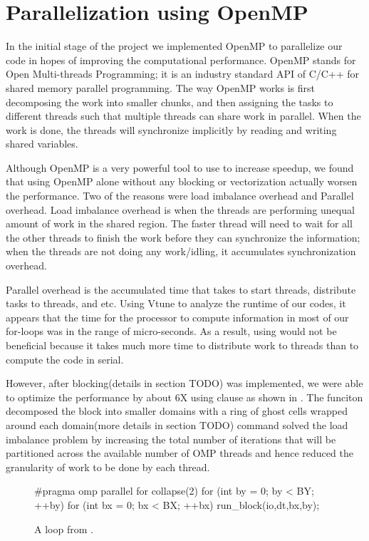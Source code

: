 \section{Parallelization using OpenMP}\label{sec:parallelization}

In the initial stage of the project we implemented OpenMP to parallelize our code in hopes of improving the computational performance. OpenMP stands for Open Multi-threads Programming; it is an industry standard API of C/C++ for shared memory parallel programming.  The way OpenMP works is first decomposing the work into smaller chunks, and then assigning the tasks to different threads such that multiple threads can share work in parallel. When the work is done, the threads will synchronize implicitly by reading and writing shared variables.

Although OpenMP is a very powerful tool to use to increase speedup, we found that using OpenMP alone without any blocking or vectorization actually worsen the performance. Two of the reasons were load imbalance overhead and Parallel overhead. Load imbalance overhead is when the threads are performing unequal amount of work in the shared region. The faster thread will need to wait for all the other threads to finish the work before they can synchronize the information; when the threads are not doing any work/idling, it accumulates synchronization overhead.

Parallel overhead is the accumulated time that takes to start threads, distribute tasks to threads, and etc. Using Vtune to analyze the runtime of our codes, it appears that the time for the processor to compute information in most of our for-loops was in the range of micro-seconds. As a result, using  would not be beneficial because it takes much more time to distribute work to threads than to compute the code in serial.

However, after blocking(details in section TODO) was implemented, we were able to optimize the performance by about 6X using  clause as shown in . The  funciton decomposed the block into smaller domains with a ring of ghost cells wrapped around each domain(more details in section TODO)  command solved the load imbalance problem by increasing the total number of iterations that will be partitioned across the available number of OMP threads and hence reduced the granularity of work to be done by each thread.

\begin{figure}[h]
\centering
\begin{CPP}[firstnumber=476]
 #pragma omp parallel for collapse(2)
      for (int by = 0; by < BY; ++by) {
         for (int bx = 0; bx < BX; ++bx) {
              run_block(io,dt,bx,by);
                 }
           }
\end{CPP}
\caption{A loop from .}
\label{fig:omp}
\end{figure}
